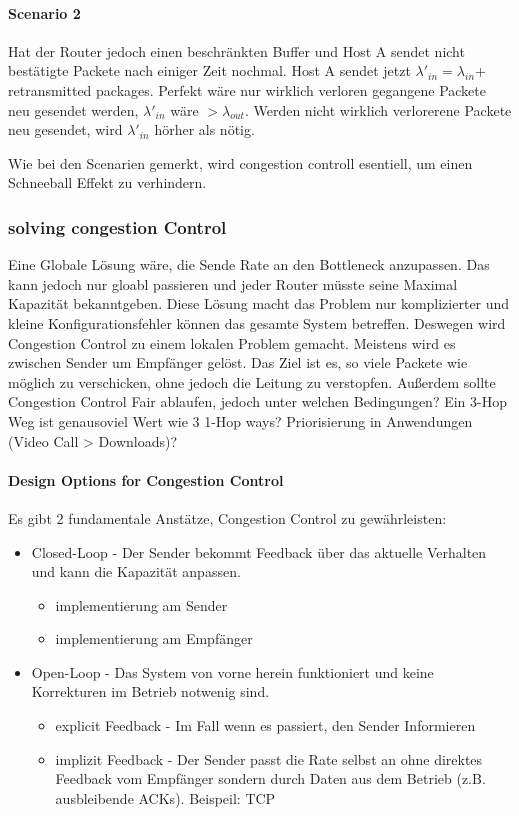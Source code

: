 		\paragraph{Scenario 2}
			Hat der Router jedoch einen beschränkten Buffer und Host A sendet nicht bestätigte Packete nach einiger Zeit nochmal. Host A sendet jetzt $\lambda'_{in}=\lambda_{in}$+ retransmitted packages. Perfekt wäre nur wirklich verloren gegangene Packete neu gesendet werden, $\lambda'_{in}$ wäre $>\lambda_{out}$. Werden nicht wirklich verlorerene Packete neu gesendet, wird $\lambda'_{in}$ hörher als nötig. 

		Wie bei den Scenarien gemerkt, wird congestion controll esentiell, um einen Schneeball Effekt zu verhindern. 
		
		\subsubsection{solving congestion Control}
			Eine Globale Lösung wäre, die Sende Rate an den Bottleneck anzupassen. Das kann jedoch nur gloabl passieren und jeder Router müsste seine Maximal Kapazität bekanntgeben. Diese Lösung macht das Problem nur komplizierter und kleine Konfigurationsfehler können das gesamte System betreffen. Deswegen wird Congestion Control zu einem lokalen Problem gemacht. Meistens wird es zwischen Sender um Empfänger gelöst. 
			Das Ziel ist es, so viele Packete wie möglich zu verschicken, ohne jedoch die Leitung zu verstopfen. Außerdem sollte Congestion Control Fair ablaufen, jedoch unter welchen Bedingungen? Ein 3-Hop Weg ist genausoviel Wert wie 3 1-Hop ways? Priorisierung in Anwendungen (Video Call > Downloads)? 

			\paragraph{Design Options for Congestion Control}
				Es gibt 2 fundamentale Anstätze, Congestion Control zu gewährleisten:
				\begin{itemize}
					\item Closed-Loop - Der Sender bekommt Feedback über das aktuelle Verhalten und kann die Kapazität anpassen. 
						\begin{itemize}
							\item implementierung am Sender
							\item implementierung am Empfänger
						\end{itemize}
					\item Open-Loop - Das System von vorne herein funktioniert und keine Korrekturen im Betrieb notwenig sind.
						\begin{itemize}
							\item explicit Feedback - Im Fall wenn es passiert, den Sender Informieren
							\item implizit Feedback - Der Sender passt die Rate selbst an ohne direktes Feedback vom Empfänger sondern durch Daten aus dem Betrieb (z.B. ausbleibende ACKs). Beispeil: TCP
						\end{itemize}
				\end{itemize}
			
